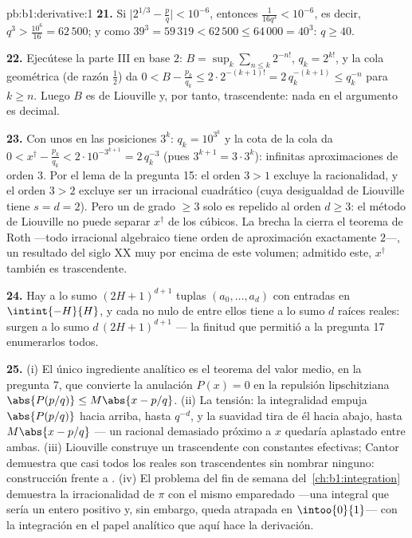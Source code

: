 \begin{solution}{pb:b1:derivative:1}
\textbf{21.} Si $\bigl|2^{1/3} - \frac pq\bigr| < 10^{-6}$, entonces
$\frac{1}{16 q^3} < 10^{-6}$, es decir,
$q^3 > \frac{10^6}{16} = 62\,500$; y como
$39^3 = 59\,319 < 62\,500 \leq 64\,000 = 40^3$: $q \geq 40$.

\textbf{22.} Ejecútese la parte III en base $2$:
$B = \sup_k \sum_{n\leq k} 2^{-n!}$, $q_k = 2^{k!}$, y la cola
geométrica (de razón $\frac12$) da
$0 < B - \frac{p_k}{q_k} \leq 2\cdot2^{-(k+1)!} = 2\,q_k^{-(k+1)}
\leq q_k^{-n}$ para $k \geq n$. Luego $B$ es de Liouville y, por
tanto, trascendente: nada en el argumento es decimal.

\textbf{23.} Con unos en las posiciones $3^k$: $q_k = 10^{3^k}$ y la
cota de la cola da
$0 < x^\dagger - \frac{p_k}{q_k} < 2\cdot10^{-3^{k+1}} =
2\,q_k^{-3}$ (pues $3^{k+1} = 3\cdot3^k$): infinitas aproximaciones
de orden $3$. Por el lema de la pregunta 15: el orden $3 > 1$ excluye
la racionalidad, y el orden $3 > 2$ excluye ser un irracional
cuadrático (cuya desigualdad de Liouville tiene $s = d = 2$). Pero un
 de grado $\geq 3$ solo es repelido al orden
$d \geq 3$: el método de Liouville no puede separar $x^\dagger$ de
los cúbicos. La brecha la cierra el teorema de Roth ---todo
irracional algebraico tiene orden de aproximación exactamente $2$---,
un resultado del siglo XX muy por encima de este volumen; admitido
este, $x^\dagger$ también es trascendente.

\textbf{24.} Hay a lo sumo $(2H+1)^{d+1}$ tuplas
$(a_0, \dots, a_d)$ con entradas en $\intint{-H}{H}$, y cada
 no nulo de entre ellos tiene a lo sumo $d$ raíces reales:
surgen a lo sumo $d\,(2H+1)^{d+1}$  --- la
finitud que permitió a la pregunta 17 enumerarlos todos.

\textbf{25.} (i) El único ingrediente analítico es el teorema del
valor medio, en la pregunta 7, que convierte la anulación
$P(x) = 0$ en la repulsión lipschitziana
$\abs{P(p/q)} \leq M\abs{x - p/q}$. (ii) La tensión: la
integralidad empuja $\abs{P(p/q)}$ hacia arriba, hasta $q^{-d}$, y la
suavidad tira de él hacia abajo, hasta $M\abs{x - p/q}$ --- un
racional demasiado próximo a $x$ quedaría aplastado entre ambas.
(iii) Liouville construye un trascendente con constantes efectivas;
Cantor demuestra que casi todos los reales son trascendentes sin
nombrar ninguno: construcción frente a . (iv) El problema
del fin de semana del~\cref{ch:b1:integration} demuestra la
irracionalidad de $\pi$ con el mismo emparedado ---una integral que
sería un entero positivo y, sin embargo, queda atrapada en
$\intoo{0}{1}$--- con la integración en el papel analítico que aquí
hace la derivación.
\end{solution}
